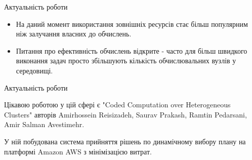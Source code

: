 \begin{frame}{Актуальність роботи}
	\manimate
	
	\begin{itemize}
		\item На даний момент використання зовнішніх ресурсів стає більш популярним ніж залучання власних до обчислень.
		\item Питання про ефективність обчислень відкрите - часто для більш швидкого виконання задач просто збільшують кількість обчислювальних вузлів у середовищі.
	\end{itemize}
\end{frame}

\begin{frame}{Актуальність роботи}
	\manimate
	
	Цікавою роботою у цій сфері є "Coded Computation over Heterogeneous Clusters" авторів Amirhossein Reisizadeh, Saurav Prakash, Ramtin Pedarsani, Amir Salman Avestimehr.
	
	У ній побудована система прийняття рішень по динамічному вибору плану на платформі Amazon AWS з мінімізацією витрат.


\end{frame}


